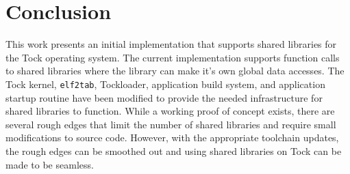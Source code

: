 \documentclass[12pt]{ucsddissertation}
\begin{document}
\chapter{Conclusion}
This work presents an initial implementation that supports shared libraries for the Tock operating system. The current implementation supports function calls to shared libraries where the library can make it's own global data accesses. The Tock kernel, \texttt{elf2tab}, Tockloader, application build system, and application startup routine have been modified to provide the needed infrastructure for shared libraries to function.  While a working proof of concept exists, there are several rough edges that limit the number of shared libraries and require small modifications to source code. However, with the appropriate toolchain updates, the rough edges can be smoothed out and using shared libraries on Tock can be made to be seamless. 


%

%
%
%
\end{document}
